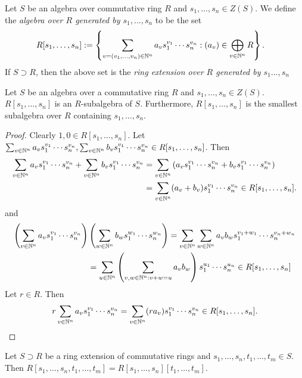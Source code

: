 \begin{definition}
    Let $S$ be an algebra over commutative ring $R$ and $s_1,\dots,s_n\in Z(S)$. We define the \textit{algebra over $R$ generated by $s_1,\dots,s_n$} to be the set 
    \begin{align*}
        R[s_1,\dots,s_n] &:= \left\{ \sum_{v=(v_1,\dots,v_n)\in \mathbb{N}^n} a_vs_1^{v_1}\cdots s_n^{v_n} : (a_v)\in \bigoplus_{v\in\mathbb{N}^n} R \right\}.
    \end{align*}
    If $S\supset R$, then the above set is the \textit{ring extension over $R$ generated by $s_1\dots,s_n$}
\end{definition}
\begin{lemma}
    Let $S$ be an algebra over a commutative ring $R$ and $s_1,\dots,s_n\in Z(S)$. $R[s_1,\dots,s_n]$ is an $R$-subalgebra of $S$. Furthermore, $R[s_1,\dots,s_n]$ is the smallest subalgebra over $R$ containing $s_1,\dots,s_n$.   
\end{lemma}
\begin{proof}
    Clearly $1,0\in R[s_1,\dots,s_n]$. Let $\sum_{v\in \mathbb{N}^n} a_vs_1^{v_1}\cdots s_n^{v_n}, \sum_{v\in \mathbb{N}^n} b_vs_1^{v_1}\cdots s_n^{v_n}\in R[s_1,\dots,s_n]$. Then 
    \begin{align*}
        \sum_{v\in \mathbb{N}^n} a_vs_1^{v_1}\cdots s_n^{v_n}+\sum_{v\in \mathbb{N}^n} b_vs_1^{v_1}\cdots s_n^{v_n} &= \sum_{v\in \mathbb{N}^n} \left(a_vs_1^{v_1}\cdots s_n^{v_n}+b_vs_1^{v_1}\cdots s_n^{v_n}\right)\\ &= \sum_{v\in\mathbb{N}^n} (a_v+b_v)s_1^{v_1}\cdots s_n^{v_n} \in R[s_1,\dots,s_n].
    \end{align*}
    and 
    \begin{align*}
        \left(\sum_{v\in \mathbb{N}^n} a_vs_1^{v_1}\cdots s_n^{v_n}\right)&\left(\sum_{w\in \mathbb{N}^n} b_ws_1^{w_1}\cdots s_n^{w_n}\right) = \sum_{v\in \mathbb{N}^n}\sum_{w \in \mathbb{N}^n} a_vb_w s_1^{v_1+w_1}\cdots s_n^{v_n+w_n} \\
        &= \sum_{u\in \mathbb{N}^n} \left(\sum_{v,w\in \mathbb{N}^n : v+w = u} a_vb_w \right)s_1^{u_1}\cdots s_n^{u_n}\in R[s_1,\dots,s_n]
    \end{align*}
    Let $r\in R$. Then 
    $$r\sum_{v\in\mathbb{N}^n} a_vs_1^{v_1}\cdots s_n^{v_n} = \sum_{v\in\mathbb{N}^n} (ra_v)s_1^{v_1}\cdots s_n^{v_n}\in R[s_1,\dots,s_n].$$
\end{proof}
\begin{lemma}
    Let $S\supset R$ be a ring extension of commutative rings and $s_1,\dots,s_n,t_1,\dots,t_m\in S$. Then $R[s_1,\dots,s_n,t_1,\dots,t_m]=R[s_1,\dots,s_n][t_1,\dots,t_m].$
\end{lemma}
